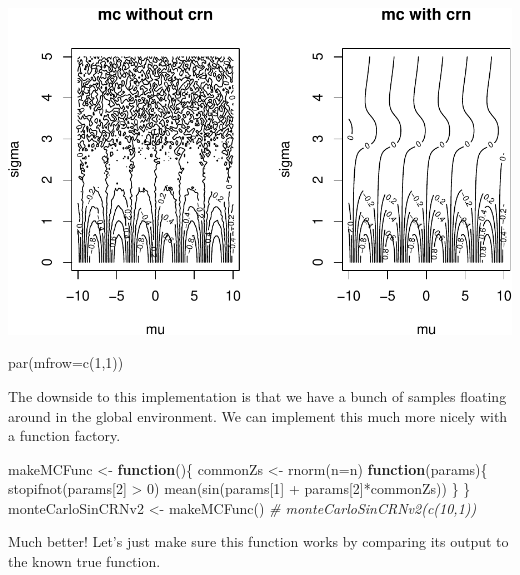 \documentclass[
  12pt,
]{krantz}
\makeatletter
\newenvironment{Shaded}{\begin{snugshade}}{\end{snugshade}}
\newcommand{\AttributeTok}[1]{\textcolor[rgb]{0.61,0.61,0.61}{#1}}
\newcommand{\CommentTok}[1]{\textcolor[rgb]{0.37,0.37,0.37}{\textit{#1}}}
\newcommand{\ControlFlowTok}[1]{\textcolor[rgb]{0.27,0.27,0.27}{\textbf{#1}}}
\newcommand{\DecValTok}[1]{\textcolor[rgb]{0.06,0.06,0.06}{#1}}
\newcommand{\FunctionTok}[1]{\textcolor[rgb]{0,0,0}{#1}}
\newcommand{\NormalTok}[1]{#1}
\newcommand{\OtherTok}[1]{\textcolor[rgb]{0.37,0.37,0.37}{#1}}
\newcommand{\SpecialCharTok}[1]{\textcolor[rgb]{0,0,0}{#1}}
\newenvironment{kframe}{%
\medskip{}
\setlength{\fboxsep}{.8em}
 \def\at@end@of@kframe{}%
 \ifinner\ifhmode%
  \def\at@end@of@kframe{\end{minipage}}%
  \begin{minipage}{\columnwidth}%
 \fi\fi%
 \def\FrameCommand##1{\hskip\@totalleftmargin \hskip-\fboxsep
 \colorbox{shadecolor}{##1}\hskip-\fboxsep
     \hskip-\linewidth \hskip-\@totalleftmargin \hskip\columnwidth}%
 \MakeFramed {\advance\hsize-\width
   \@totalleftmargin\z@ \linewidth\hsize
   \@setminipage}}%
 {\par\unskip\endMakeFramed%
 \at@end@of@kframe}
\renewenvironment{Shaded}{\begin{kframe}}{\end{kframe}}
\makeatother
\begin{document}
\includegraphics{r_and_python_book_files/figure-latex/unnamed-chunk-242-1.pdf}

\begin{Shaded}
\begin{Highlighting}[]
\FunctionTok{par}\NormalTok{(}\AttributeTok{mfrow=}\FunctionTok{c}\NormalTok{(}\DecValTok{1}\NormalTok{,}\DecValTok{1}\NormalTok{))}
\end{Highlighting}
\end{Shaded}

The downside to this implementation is that we have a bunch of samples floating around in the global environment. We can implement this much more nicely with a function factory.

\begin{Shaded}
\begin{Highlighting}[]
\NormalTok{makeMCFunc }\OtherTok{\textless{}{-}} \ControlFlowTok{function}\NormalTok{()\{}
\NormalTok{  commonZs }\OtherTok{\textless{}{-}} \FunctionTok{rnorm}\NormalTok{(}\AttributeTok{n=}\NormalTok{n)}
  \ControlFlowTok{function}\NormalTok{(params)\{}
    \FunctionTok{stopifnot}\NormalTok{(params[}\DecValTok{2}\NormalTok{] }\SpecialCharTok{\textgreater{}} \DecValTok{0}\NormalTok{) }
    \FunctionTok{mean}\NormalTok{(}\FunctionTok{sin}\NormalTok{(params[}\DecValTok{1}\NormalTok{] }\SpecialCharTok{+}\NormalTok{ params[}\DecValTok{2}\NormalTok{]}\SpecialCharTok{*}\NormalTok{commonZs))    }
\NormalTok{  \}  }
\NormalTok{\}}
\NormalTok{monteCarloSinCRNv2 }\OtherTok{\textless{}{-}} \FunctionTok{makeMCFunc}\NormalTok{()}
\CommentTok{\# monteCarloSinCRNv2(c(10,1))}
\end{Highlighting}
\end{Shaded}

Much better! Let's just make sure this function works by comparing its output to the known true function.
\end{document}
